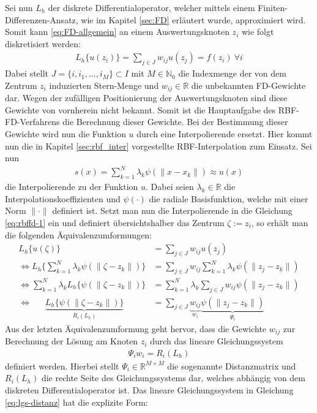 \documentclass[12pt,titlepage]{article}
\begin{document}
Sei nun $L_h$ der diskrete Differentialoperator, welcher mittels einem Finiten-Differenzen-Ansatz, wie im Kapitel \ref{sec:FD} erläutert wurde, approximiert wird. Somit kann \eqref{eq:FD-allgemein} an einem Auswertungsknoten $z_i$ wie folgt diskretisiert werden:
\begin{align}
 L_h\{u(z_i)\}=\sum_{j\in J}w_{ij}u(z_j)=f(z_i)~\forall i\label{eq:rbffd-1}
\end{align}
Dabei stellt $J=\{i,i_1,\dots,i_M\}\subset I$ mit $M\in\mathbb{N}_0$ die Indexmenge der von dem Zentrum $z_i$ induzierten Stern-Menge und $w_{ij}\in\mathbb{R}$ die unbekannten FD-Gewichte dar. Wegen der zufälligen Positionierung der Auswertungsknoten sind diese Gewichte von vornherein nicht bekannt. Somit ist die Hauptaufgabe des RBF-FD-Verfahrens die Berechnung dieser Gewichte. Bei der Bestimmung dieser Gewichte wird nun die Funktion $u$ durch eine Interpolierende ersetzt. Hier kommt nun die in Kapitel \ref{sec:rbf_inter} vorgestellte RBF-Interpolation zum Einsatz. Sei nun
\begin{align}
 s(x)=\sum_{k=1}^N\lambda_k\psi(\|x-x_k\|)\approx u(x)\nonumber
\end{align}
die Interpolierende zu der Funktion $u$. Dabei seien $\lambda_k\in\mathbb{R}$ die Interpolationskoeffizienten und $\psi(\cdot)$ die radiale Basisfunktion, welche mit einer Norm $\|\cdot\|$ definiert ist. Setzt man nun die Interpolierende in die Gleichung \eqref{eq:rbffd-1} ein und definiert übersichtshalber das Zentrum $\zeta:=z_i$, so erhält man die folgenden Äquivalenzumformungen:
\begin{align}
  L_h\{u(\zeta)\}&=\sum_{j\in J}w_{ij}u(z_j)\nonumber\\
\Leftrightarrow L_h\{\sum_{k=1}^N\lambda_k\psi(\|\zeta-z_k\|)\}&=\sum_{j\in J}w_{ij}\sum_{k=1}^N\lambda_k\psi(\|z_j-z_k\|)\nonumber\\
\Leftrightarrow \sum_{k=1}^N\lambda_kL_h\{\psi(\|\zeta-z_k\|)\}&=\sum_{k=1}^N\lambda_k\sum_{j\in J}w_{ij}\psi(\|z_j-z_k\|)\nonumber\\
\Leftrightarrow~~~~~~~ \underbrace{L_h\{\psi(\|\zeta-z_k\|)\}}_{R_i(L_h)}&=\sum_{j\in J}\underbrace{w_{ij}}_{w_i}\underbrace{\psi(\|z_j-z_k\|)}_{\Psi_i}\nonumber
\end{align}
Aus der letzten Äquivalenzumformung geht hervor, dass die Gewichte $w_{ij}$ zur Berechnung der Lösung am Knoten $z_i$ durch das lineare Gleichungssystem
\begin{align}
 \Psi_i w_i=R_i(L_h)\label{eq:lgs-distanz}
\end{align}
definiert werden. Hierbei stellt $\Psi_i\in\mathbb{R}^{M\times M}$ die sogenannte Distanzmatrix und $R_i(L_h)$ die rechte Seite des Gleichungssystems dar, welches abhängig von dem diskreten Differentialoperator ist. Das lineare Gleichungssystem in  Gleichung \eqref{eq:lgs-distanz} hat die explizite Form:
\end{document}
